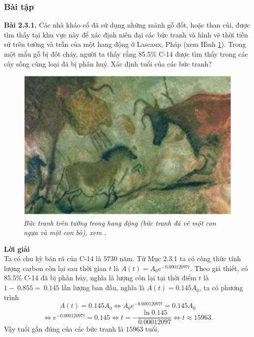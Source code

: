 \subsubsection{Bài tập}
\noindent\textbf{Bài 2.3.1.} Các nhà khảo cổ đã sử dụng những mảnh gỗ đốt, hoặc than củi, được tìm thấy tại khu vực này để xác định niên đại các bức tranh và hình vẽ thời tiền sử trên tường và trần của một hang động ở Lascaux, Pháp (xem Hình \ref{hinh2.5.}). Trong một mẩu gỗ bị đốt cháy, người ta thấy rằng  85.5\% C-14 được tìm thấy trong các cây sống cùng loại đã bị phân huỷ. Xác định tuổi của các bức tranh?
\begin{figure}[H]
	\centering
	\includegraphics[scale=0.4]{Images/hinh_2_5.png}
	\caption[Bức tranh trên tường trong hang động (bức tranh đá vẽ một con ngựa và một con bò), xem \cite{ref4}.]{\itshape\fontsize{13pt}{0pt}\selectfont\centering Bức tranh trên tường trong hang động (bức tranh đá vẽ một con ngựa và một con bò), xem \cite{ref4}.}
	\label{hinh2.5.}
\end{figure}
\noindent\textbf{Lời giải}\\
Ta có chu kỳ bán rã của C-14 là $5730$ năm. Từ Mục 2.3.1 ta có công thức tính lượng carbon còn lại sau thời gian $t$ là $A(t)={{A}_{0}}{{e}^{-0.00012097t}}.$
Theo giả thiết, có 85.5\% C-14 đã bị phân hủy, nghĩa là lượng còn lại tại thời điểm $t$ là $1 -~ 0.855 =~ 0.145$ lần lượng ban đầu, nghĩa là $A(t)=0.145{{A}_{0}}$, ta có phương~ trình
$$ A(t)=0.145{{A}_{0}}\Leftrightarrow {{A}_{0}}{{e}^{-0.00012097t}}=0.145{{A}_{0}} $$
	$$\Leftrightarrow {{e}^{-0.00012097t}}=0.145\Leftrightarrow t=-\dfrac{\ln 0.145}{0.00012097}\Leftrightarrow t\approx 15963. $$
Vậy tuổi gần đúng của các bức tranh là $15963$ tuổi.\\
